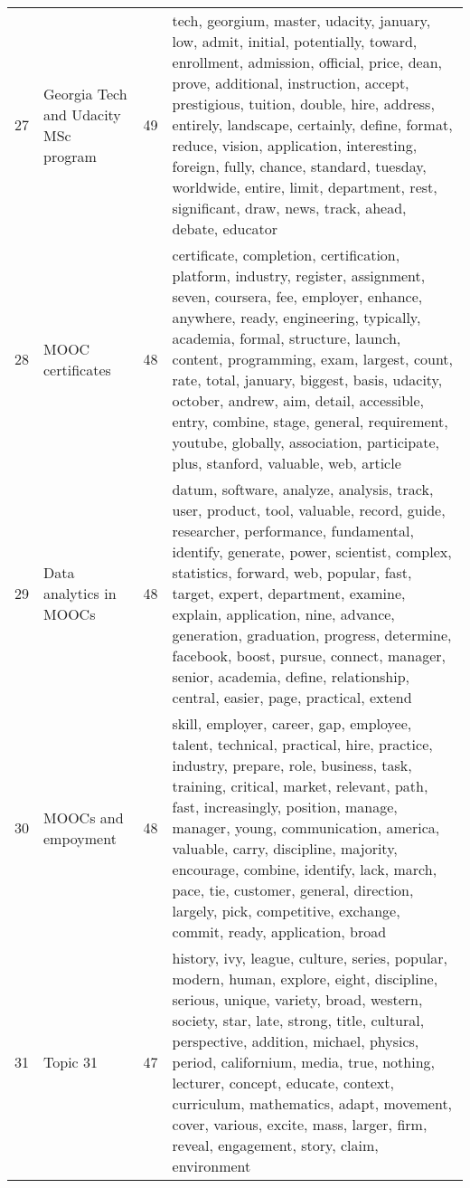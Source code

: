 \begin{table}[ht]
{\begin{tabularx}{\textwidth}{llrX}
   27 & Georgia Tech and Udacity MSc program & 49 & tech, georgium, master, udacity, january, low, admit, initial, potentially, toward, enrollment, admission, official, price, dean, prove, additional, instruction, accept, prestigious, tuition, double, hire, address, entirely, landscape, certainly, define, format, reduce, vision, application, interesting, foreign, fully, chance, standard, tuesday, worldwide, entire, limit, department, rest, significant, draw, news, track, ahead, debate, educator \\ 
   28 & MOOC certificates & 48 & certificate, completion, certification, platform, industry, register, assignment, seven, coursera, fee, employer, enhance, anywhere, ready, engineering, typically, academia, formal, structure, launch, content, programming, exam, largest, count, rate, total, january, biggest, basis, udacity, october, andrew, aim, detail, accessible, entry, combine, stage, general, requirement, youtube, globally, association, participate, plus, stanford, valuable, web, article \\ 
   29 & Data analytics in MOOCs & 48 & datum, software, analyze, analysis, track, user, product, tool, valuable, record, guide, researcher, performance, fundamental, identify, generate, power, scientist, complex, statistics, forward, web, popular, fast, target, expert, department, examine, explain, application, nine, advance, generation, graduation, progress, determine, facebook, boost, pursue, connect, manager, senior, academia, define, relationship, central, easier, page, practical, extend \\ 
   30 & MOOCs and empoyment & 48 & skill, employer, career, gap, employee, talent, technical, practical, hire, practice, industry, prepare, role, business, task, training, critical, market, relevant, path, fast, increasingly, position, manage, manager, young, communication, america, valuable, carry, discipline, majority, encourage, combine, identify, lack, march, pace, tie, customer, general, direction, largely, pick, competitive, exchange, commit, ready, application, broad \\ 
   31 & Topic 31 & 47 & history, ivy, league, culture, series, popular, modern, human, explore, eight, discipline, serious, unique, variety, broad, western, society, star, late, strong, title, cultural, perspective, addition, michael, physics, period, californium, media, true, nothing, lecturer, concept, educate, context, curriculum, mathematics, adapt, movement, cover, various, excite, mass, larger, firm, reveal, engagement, story, claim, environment \\ 

\end{tabularx}}
\end{table}
